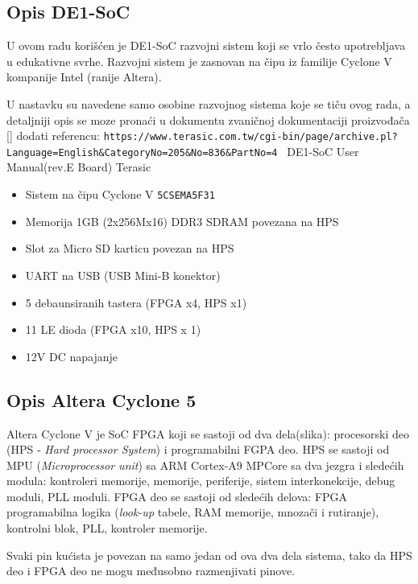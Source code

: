 \subsection{Opis DE1-SoC}

U ovom radu korišćen je DE1-SoC razvojni sistem koji se vrlo često upotrebljava u edukativne svrhe. Razvojni sistem je zasnovan na čipu iz familije Cyclone V kompanije Intel (ranije Altera).

U nastavku su navedene samo osobine razvojnog sistema koje se tiču ovog rada, a detaljniji opis se moze pronaći u dokumentu zvaničnoj dokumentaciji proizvođača []
dodati referencu: \verb+https://www.terasic.com.tw/cgi-bin/page/archive.pl?Language=English&CategoryNo=205&No=836&PartNo=4 +
DE1-SoC User Manual(rev.E Board)
Terasic
\begin{itemize}
\item Sistem na čipu Cyclone V \texttt{5CSEMA5F31}
\item Memorija 1GB (2x256Mx16) DDR3 SDRAM povezana na HPS
\item Slot za Micro SD karticu povezan na HPS
\item UART na USB (USB Mini-B konektor)
\item 5 debaunsiranih tastera (FPGA x4, HPS x1)
\item 11 LE dioda (FPGA x10, HPS x 1)
\item 12V DC napajanje
\end{itemize}

\subsection{Opis Altera Cyclone 5}
Altera Cyclone V je SoC FPGA koji se sastoji od dva dela(slika): procesorski deo (HPS -  \textit{Hard processor System}) i programabilni FGPA deo. HPS se sastoji od MPU (\textit{Microprocessor unit}) sa ARM Cortex-A9 MPCore sa dva jezgra i sledećih modula: kontroleri memorije, memorije, periferije, sistem interkonekcije, debug moduli, PLL moduli. FPGA deo se sastoji od sledećih delova: FPGA programabilna logika (\textit{look-up} tabele, RAM memorije, mnozači i rutiranje), kontrolni blok, PLL, kontroler memorije.

Svaki pin kućista je povezan na samo jedan od ova dva dela sistema, tako da HPS deo i FPGA deo ne mogu međusobno razmenjivati pinove.

